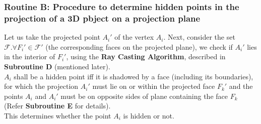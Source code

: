 \documentclass[12pt]{report}
\begin{document}
\subsubsection*{Routine B: Procedure to determine hidden points in the projection of a 3D pbject on a projection plane}
Let us take the projected point \(A_{i}' \) of the vertex \(A_{i} \). Next, consider the set \(\mathcal{F}. \forall F_{i}' \in \mathcal{F'}\) (the corresponding faces on the projected plane), we check if \(A_{i}'\) lies in the interior of \(F_{i}'\), using the \textbf{Ray Casting Algorithm}, described in \textbf{Subroutine D} (mentioned later).
\\
\(A_{i}\) shall be a hidden point iff it is shadowed by a face (including its boundaries), for which the projection \(A_{i}'\) must lie on or within the projected face \(F_{k}'\) and the points \(A_{i}\) and \(A_{i}'\) must be on opposite sides of plane containing the face \(F_{k}\) (Refer \textbf{Subroutine E} for details). \\
This determines whether the point \(A_{i} \) is hidden or not.
\end{document}
